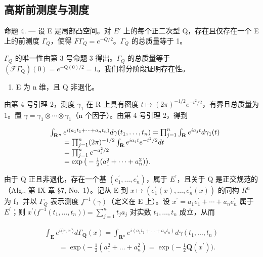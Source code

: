 \subsection{高斯前测度与测度}

命题 4. --- 设 E 是局部凸空间。对 \(E'\) 上的每个正二次型 Q，存在且仅存在一个 E 上的前测度 \(\Gamma_{Q}\)，使得 \(F\Gamma_{Q}=e^{-Q/2}\)。\(\Gamma_{Q}\) 的总质量等于 1。

\(\Gamma_{Q}\) 的唯一性由第 3 号命题 3 得出。\(\Gamma_{Q}\) 的总质量等于 \((\mathcal{F}\Gamma_{\mathrm{Q}})(0)=e^{-\mathrm{Q}(0)/2}=1\)。我们将分阶段证明存在性。

\begin{enumerate}
\def\labelenumi{\Alph{enumi})}
\tightlist
\item
  E 为 n 维，且 Q 非退化。
\end{enumerate}

由第 4 号引理 2，测度 \(\gamma_{1}\) 在 R 上具有密度 \(t \mapsto (2\pi)^{-1/2}e^{-t^{2}/2}\)，有界且总质量为 1。置 \(\gamma = \gamma_{1} \otimes \cdots \otimes \gamma_{1}\)（n 个因子）。由第 4 号引理 2，得到

\[
\begin{array}{r l} & {\int_ {\mathbf {R} ^ {n}} e ^ {i (a _ {1} t _ {1} + \dots + a _ {n} t _ {n})} d \gamma (t _ {1}, \ldots , t _ {n}) = \prod_ {j = 1} ^ {n} \int_ {\mathbf {R}} e ^ {i a _ {j} t} d \gamma_ {1} (t)} \\ & {\qquad = \prod_ {j = 1} ^ {n} (2 \pi) ^ {- 1 / 2} \int_ {\mathbf {R}} e ^ {i a _ {j} t} e ^ {- t ^ {2} / 2} d t} \\ & {\qquad = \prod_ {j = 1} ^ {n} e ^ {- a _ {j} ^ {2} / 2}} \\ & {\qquad = \exp \big (- \frac {1}{2} (a _ {1} ^ {2} + \dots + a _ {n} ^ {2}) \big).} \end{array}
\]

由于 Q 正且非退化，存在一个基 \((e_{1}^{\prime},\ldots,e_{n}^{\prime})\)，属于 \(E^{\prime}\)，且关于 Q 是正交规范的（Alg., 第 IX 章 §7, No.~1）。记从 E 到 \(x\mapsto(e_{1}^{\prime}(x),\ldots,e_{n}^{\prime}(x))\) 的同构 \(R^{n}\) 为 f，并以 \(\Gamma_{Q}\) 表示测度 \(f^{-1}(\gamma)\)（定义在 E 上）。设 \(x^{\prime}=a_{1}e_{1}^{\prime}+\cdots+a_{n}e_{n}^{\prime}\) 属于 \(E^{\prime}\)；则 \(x^{\prime}\big(f^{-1}(t_{1},\ldots,t_{n})\big)=\sum_{j=1}^{n}t_{j}a_{j}\) 对实数 \(t_{1},\ldots,t_{n}\) 成立，从而

\[
\begin{array}{l} \int_ {\mathbf {E}} e ^ {i \langle x, x ^ {\prime} \rangle} d \Gamma_ {\mathbf {Q}} (x) = \int_ {\mathbf {R} ^ {n}} e ^ {i (a _ {1} t _ {1} + \dots + a _ {n} t _ {n})} d \gamma (t _ {1}, \ldots , t _ {n}) \\ \qquad = \exp \big (- \frac {1}{2} (a _ {1} ^ {2} + \dots + a _ {n} ^ {2}) = \exp \big (- \frac {1}{2} \mathbf {Q} (x ^ {\prime}) \big). \end{array}
\]

